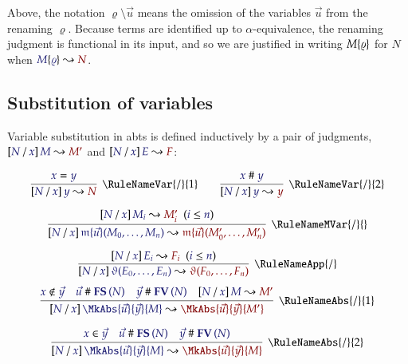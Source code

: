 Above, the notation $\varrho\setminus\vec{u}$ means the omission of the
variables $\vec{u}$ from the renaming $\varrho$. Because terms are identified up
to $\alpha$-equivalence, the renaming judgment is functional in its input, and
so we are justified in writing $M\{\varrho\}$ for $N$ when
$\IsRenaming{\varrho}{M}{N}$.

\subsection{Substitution of variables}

\newcommand\RuleSubstPrefix{/}
\newcommand\RuleSubstVar[1]{\RuleNameVar{\RuleSubstPrefix}{#1}}
\newcommand\RuleSubstMVar{\RuleNameMVar{\RuleSubstPrefix}{}}
\newcommand\RuleSubstApp{\RuleNameApp{\RuleSubstPrefix}}
\newcommand\RuleSubstAbs[1]{\RuleNameAbs{\RuleSubstPrefix}{#1}}

Variable substitution in abts is defined inductively by a pair of judgments,
$\IsSubst{N}{x}{M}{M'}$ and $\IsSubst{N}{x}{E}{F}$:

\begin{gather*}
  \infer[\RuleSubstVar{1}]{
    \IsSubst{N}{x}{y}{N}
  }{
    \IsEq{x}{y}
  }
  \qquad
  \infer[\RuleSubstVar{2}]{
      \IsSubst{N}{x}{y}{y}
    }{
      \IsApart{x}{y}
    }
\\[6pt]
  \infer[\RuleSubstMVar]{
    \IsSubst{N}{x}{
      \MApp{\MV{m}}{\vec{u}}{M_0,\dots,M_n}
    }{
      \MApp{\MV{m}}{\vec{u}}{M'_0,\dots,M'_n}
    }
  }{
    \HypJ{
      \IsSubst{N}{x}{M_i}{M'_i}
    }{
      \Leq{i}{n}
    }
  }
\\[6pt]
  \infer[\RuleSubstApp]{
    \IsSubst{N}{x}{
      \App{\vartheta}{E_0,\dots,E_n}
    }{
      \App{\vartheta}{F_0,\dots,F_n}
    }
  }{
    \HypJ{
      \IsSubst{N}{x}{E_i}{F_i}
    }{
      \Leq{i}{n}
    }
  }
\end{gather*}
\begin{gather*}
  \infer[\RuleSubstAbs{1}]{
    \IsSubst{N}{x}{
      \MkAbs{\vec{u}}{\vec{y}}{M}
    }{
      \MkAbs{\vec{u}}{\vec{y}}{M'}
    }
  }{
    \NotIn{x}{\vec{y}}
&
    \IsApart{\vec{u}}{\FS{N}}
&
    \IsApart{\vec{y}}{\FV{N}}
&
    \IsSubst{N}{x}{M}{M'}
  }
\\[6pt]
  \infer[\RuleSubstAbs{2}]{
    \IsSubst{N}{x}{
      \MkAbs{\vec{u}}{\vec{y}}{M}
    }{
      \MkAbs{\vec{u}}{\vec{y}}{M}
    }
  }{
    \Member{x}{\vec{y}}
&
    \IsApart{\vec{u}}{\FS{N}}
&
    \IsApart{\vec{y}}{\FV{N}}
  }
\end{gather*}

